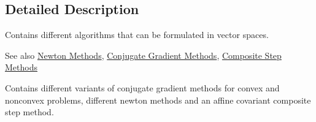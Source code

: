 \subsection{Detailed Description}
Contains different algorithms that can be formulated in vector spaces. 

\begin{DoxySeeAlso}{See also}
\hyperlink{group__NewtonGroup}{Newton Methods}, \hyperlink{group__CGGroup}{Conjugate Gradient Methods}, \hyperlink{group__CSGroup}{Composite Step Methods}
\end{DoxySeeAlso}
Contains different variants of conjugate gradient methods for convex and nonconvex problems, different newton methods and an affine covariant composite step method. 
